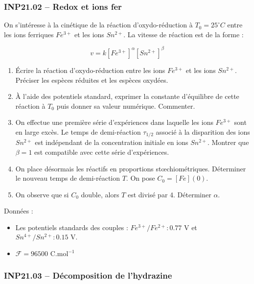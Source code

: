 \subsubsection*{INP21.02 -- Redox et ions fer  \lesdeux}

On s'intéresse à la cinétique de la réaction d'oxydo-réduction à $T_0 = 25^\circ C$ entre les ions ferriques $Fe^{3+}$ et les ions $Sn^{2+}$. La vitesse de réaction est de la forme :

\[
v = k \left[Fe^{3+}\right]^\alpha \left[Sn^{2+}\right]^\beta
\]

\begin{enumerate}
    \item Écrire la réaction d'oxydo-réduction entre les ions $Fe^{3+}$ et les ions $Sn^{2+}$. Préciser les espèces réduites et les espèces oxydées.
    \item À l'aide des potentiels standard, exprimer la constante d'équilibre de cette réaction à $T_0$ puis donner sa valeur numérique. Commenter.
    \item On effectue une première série d'expériences dans laquelle les ions $Fe^{3+}$ sont en large excès. Le temps de demi-réaction $\tau_{1/2}$ associé à la disparition des ions $Sn^{2+}$ est indépendant de la concentration initiale en ions $Sn^{2+}$. Montrer que $\beta = 1$ est compatible avec cette série d'expériences.
    \item On place désormais les réactifs en proportions stœchiométriques. Déterminer le nouveau temps de demi-réaction $T$. On pose $C_0 = [Fe](0)$.
    \item On observe que si $C_0$ double, alors $T$ est divisé par 4. Déterminer $\alpha$.
\end{enumerate}

Données :
\begin{itemize}
\item Les potentiels standards des couples  : $Fe^{3+}/Fe^{2+} : 0.77\text{ V}$ et $Sn^{4+}/Sn^{2+} : 0.15\text{ V}$.
\item $\mathcal{F}= 96500\text{ C.mol}^{-1}$
\end{itemize}

\newpage
\subsubsection*{INP21.03 -- Décomposition de l'hydrazine  \corrige}

